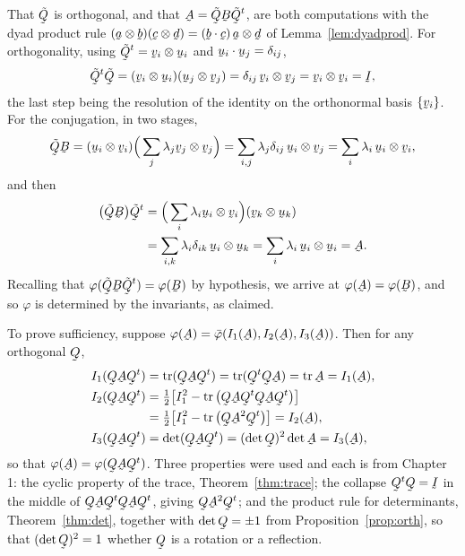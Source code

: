 That $\tilde\bQ$ is orthogonal, and that $\bA=\tilde\bQ\bB\tilde\bQ^{t}$,
are both computations with the dyad product rule
$(\ba\otimes\bb)(\bc\otimes\bd)=(\ip\bb\bc)\,\ba\otimes\bd$ of
Lemma~\ref{lem:dyadprod}. For orthogonality, using
$\tilde\bQ^{t}=\bv_{i}\otimes\bu_{i}$ and
$\ip{\bu_{i}}{\bu_{j}}=\dd_{ij}$,
\[
   \tilde\bQ^{t}\tilde\bQ
   =(\bv_{i}\otimes\bu_{i})(\bu_{j}\otimes\bv_{j})
   =\dd_{ij}\,\bv_{i}\otimes\bv_{j}
   =\bv_{i}\otimes\bv_{i}=\I ,
\]
the last step being the resolution of the identity on the orthonormal
basis $\{\bv_{i}\}$. For the conjugation, in two stages,
\[
   \tilde\bQ\bB=(\bu_{i}\otimes\bv_{i})
   \Big(\sum_{j}\lambda_{j}\bv_{j}\otimes\bv_{j}\Big)
   =\sum_{i,j}\lambda_{j}\dd_{ij}\,\bu_{i}\otimes\bv_{j}
   =\sum_{i}\lambda_{i}\,\bu_{i}\otimes\bv_{i},
\]
and then
\[
\begin{aligned}
   \big(\tilde\bQ\bB\big)\tilde\bQ^{t}
   &=\Big(\sum_{i}\lambda_{i}\bu_{i}\otimes\bv_{i}\Big)
    (\bv_{k}\otimes\bu_{k})\\
   &=\sum_{i,k}\lambda_{i}\dd_{ik}\,\bu_{i}\otimes\bu_{k}
   =\sum_{i}\lambda_{i}\,\bu_{i}\otimes\bu_{i}=\bA .
\end{aligned}
\]
Recalling that $\varphi(\tilde\bQ\bB\tilde\bQ^{t})=\varphi(\bB)$ by
hypothesis, we arrive at $\varphi(\bA)=\varphi(\bB)$, and so $\varphi$
is determined by the invariants, as claimed.

To prove sufficiency, suppose
$\varphi(\bA)=\bar\varphi(I_{1}(\bA),I_{2}(\bA),I_{3}(\bA))$. Then for
any orthogonal $\bQ$,
\[
\begin{aligned}
   I_{1}(\bQ\bA\bQ^{t})&=\tr(\bQ\bA\bQ^{t})=\tr(\bQ^{t}\bQ\bA)
     =\tr\bA=I_{1}(\bA),\\
   I_{2}(\bQ\bA\bQ^{t})
     &=\tfrac12\big[I_{1}^{2}-\tr\big(\bQ\bA\bQ^{t}\bQ\bA\bQ^{t}\big)\big]\\
     &=\tfrac12\big[I_{1}^{2}-\tr\big(\bQ\bA^{2}\bQ^{t}\big)\big]
      =I_{2}(\bA),\\
   I_{3}(\bQ\bA\bQ^{t})&=\det(\bQ\bA\bQ^{t})
     =(\det\bQ)^{2}\det\bA=I_{3}(\bA),
\end{aligned}
\]
so that $\varphi(\bA)=\varphi(\bQ\bA\bQ^{t})$. Three properties were
used and each is from Chapter 1: the cyclic property of the trace,
Theorem~\ref{thm:trace}; the collapse $\bQ^{t}\bQ=\I$ in the middle of
$\bQ\bA\bQ^{t}\bQ\bA\bQ^{t}$, giving $\bQ\bA^{2}\bQ^{t}$; and the
product rule for determinants, Theorem~\ref{thm:det}, together with
$\det\bQ=\pm1$ from Proposition~\ref{prop:orth}, so that $(\det\bQ)^{2}
=1$ whether $\bQ$ is a rotation or a reflection.

